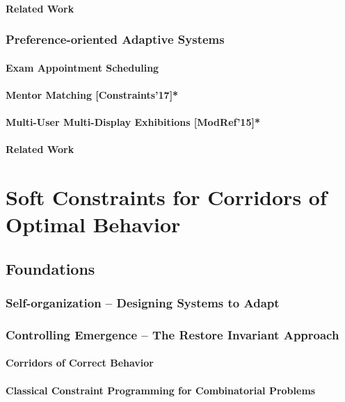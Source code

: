 \documentclass[10pt,a4paper]{book}
\begin{document}
\subsection{Related Work}

\section{Preference-oriented Adaptive Systems}
\subsection{Exam Appointment Scheduling}
\subsection{Mentor Matching [Constraints'17]*}
\subsection{Multi-User Multi-Display Exhibitions [ModRef'15]*}
\subsection{Related Work}

\part{Soft Constraints for Corridors of Optimal Behavior}

\chapter{Foundations}
\section{Self-organization -- Designing Systems to Adapt}
\section{Controlling Emergence -- The Restore Invariant Approach}
\subsection{Corridors of Correct Behavior }
\subsection{Classical Constraint Programming for Combinatorial Problems}
\end{document}
